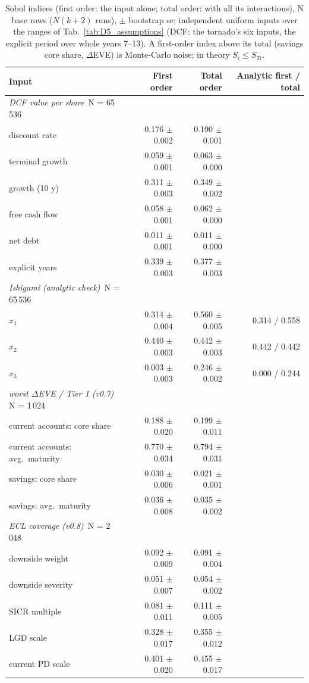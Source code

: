 \begin{table}[H]
\centering
\scriptsize
\caption{Sobol indices (first order: the input alone; total order: with all its interactions), N base rows ($N(k+2)$ runs), $\pm$ bootstrap se; independent uniform inputs over the ranges of Tab.~\ref{tab:D5_assumptions} (DCF: the tornado's six inputs, the explicit period over whole years 7--13). A first-order index above its total (savings core share, $\Delta$EVE) is Monte-Carlo noise; in theory $S_i \le S_{Ti}$.}
\label{tab:D4_sobol}
\setlength{\tabcolsep}{5pt}
\begin{tabular}{lrrr}
\toprule
Input & First order & Total order & Analytic first / total \\
\midrule
\textit{DCF value per share}\, N = 65\,536 &  &  &  \\
discount rate & 0.176 $\pm$ 0.002 & 0.190 $\pm$ 0.001 &  \\
terminal growth & 0.059 $\pm$ 0.001 & 0.063 $\pm$ 0.000 &  \\
growth (10 y) & 0.311 $\pm$ 0.003 & 0.349 $\pm$ 0.002 &  \\
free cash flow & 0.058 $\pm$ 0.001 & 0.062 $\pm$ 0.000 &  \\
net debt & 0.011 $\pm$ 0.001 & 0.011 $\pm$ 0.000 &  \\
explicit years & 0.339 $\pm$ 0.003 & 0.377 $\pm$ 0.003 &  \\
\midrule
\textit{Ishigami (analytic check)}\, N = 65\,536 &  &  &  \\
$x_1$ & 0.314 $\pm$ 0.004 & 0.560 $\pm$ 0.005 & 0.314 / 0.558 \\
$x_2$ & 0.440 $\pm$ 0.003 & 0.442 $\pm$ 0.003 & 0.442 / 0.442 \\
$x_3$ & 0.003 $\pm$ 0.003 & 0.246 $\pm$ 0.002 & 0.000 / 0.244 \\
\midrule
\textit{worst $\Delta$EVE / Tier 1 (v0.7)}\, N = 1\,024 &  &  &  \\
current accounts: core share & 0.188 $\pm$ 0.020 & 0.199 $\pm$ 0.011 &  \\
current accounts: avg.\ maturity & 0.770 $\pm$ 0.034 & 0.794 $\pm$ 0.031 &  \\
savings: core share & 0.030 $\pm$ 0.006 & 0.021 $\pm$ 0.001 &  \\
savings: avg.\ maturity & 0.036 $\pm$ 0.008 & 0.035 $\pm$ 0.002 &  \\
\midrule
\textit{ECL coverage (v0.8)}\, N = 2\,048 &  &  &  \\
downside weight & 0.092 $\pm$ 0.009 & 0.091 $\pm$ 0.004 &  \\
downside severity & 0.051 $\pm$ 0.007 & 0.054 $\pm$ 0.002 &  \\
SICR multiple & 0.081 $\pm$ 0.011 & 0.111 $\pm$ 0.005 &  \\
LGD scale & 0.328 $\pm$ 0.017 & 0.355 $\pm$ 0.012 &  \\
current PD scale & 0.401 $\pm$ 0.020 & 0.455 $\pm$ 0.017 &  \\
\bottomrule
\end{tabular}
\end{table}
